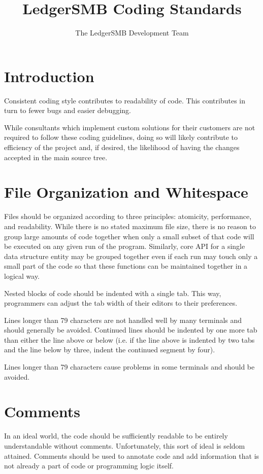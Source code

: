 \documentclass{article}
\title{LedgerSMB Coding Standards}
\author{The LedgerSMB Development Team}
\begin{document}
\maketitle

\tableofcontents

\section{Introduction}
Consistent coding style contributes to readability of code.  This contributes in
turn to fewer bugs and easier debugging.

While consultants which implement custom solutions for their customers are not
required to follow these coding guidelines, doing so will likely contribute to
efficiency of the project and, if desired, the likelihood of having the changes
accepted in the main source tree.

\section{File Organization and Whitespace}

Files should be organized according to three principles: atomicity, performance,
and readability.  While there is no stated maximum file size, there is no reason to
group large amounts of code together when only a small subset of that code will
be executed on any given run of the program.  Similarly, core API for a single
data structure entity may be grouped together even if each run may touch only a
small part of the code so that these functions can be maintained together in a
logical way.

Nested blocks of code should be indented with a single tab.  This way,
programmers can adjust the tab width of their editors to their preferences.

Lines longer than 79 characters are not handled well by many terminals and
should generally be avoided.  Continued lines should be indented by one more tab
than either the line above or below (i.e. if the line above is indented by two
tabs and the line below by three, indent the continued segment by four).

Lines longer than 79 characters cause problems in some terminals and should be
avoided.

\section{Comments}

In an ideal world, the code should be sufficiently readable to be
entirely understandable without comments.  Unfortunately, this sort of
ideal is seldom attained.  Comments should be used to annotate code
and add information that is not already a part of code or programming
logic itself.
\end{document}

